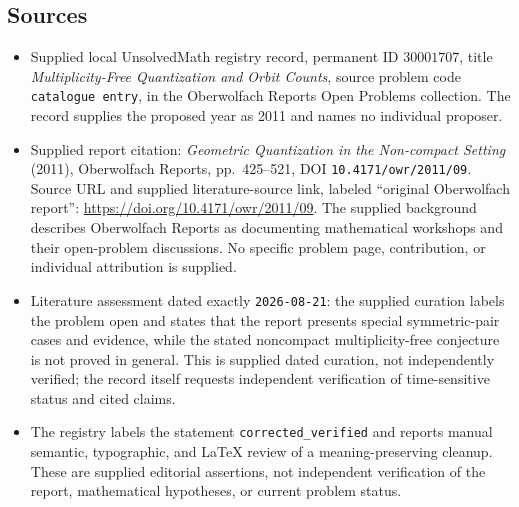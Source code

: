\documentclass[11pt]{article}
\begin{document}
\subsection{Sources}
\begin{itemize}
\item Supplied local UnsolvedMath registry record, permanent ID \(30001707\), title \emph{Multiplicity-Free Quantization and Orbit Counts}, source problem code \texttt{catalogue entry}, in the Oberwolfach Reports Open Problems collection. The record supplies the proposed year as 2011 and names no individual proposer.
\item Supplied report citation: \emph{Geometric Quantization in the Non-compact Setting} (2011), Oberwolfach Reports, pp.\ 425--521, DOI \texttt{10.4171/owr/2011/09}. Source URL and supplied literature-source link, labeled ``original Oberwolfach report'': \url{https://doi.org/10.4171/owr/2011/09}. The supplied background describes Oberwolfach Reports as documenting mathematical workshops and their open-problem discussions. No specific problem page, contribution, or individual attribution is supplied.
\item Literature assessment dated exactly \texttt{2026-08-21}: the supplied curation labels the problem open and states that the report presents special symmetric-pair cases and evidence, while the stated noncompact multiplicity-free conjecture is not proved in general. This is supplied dated curation, not independently verified; the record itself requests independent verification of time-sensitive status and cited claims.
\item The registry labels the statement \texttt{corrected\_verified} and reports manual semantic, typographic, and LaTeX review of a meaning-preserving cleanup. These are supplied editorial assertions, not independent verification of the report, mathematical hypotheses, or current problem status.
\end{itemize}
\end{document}
